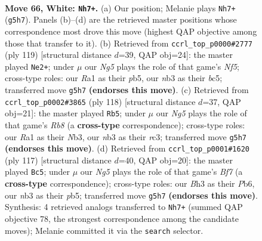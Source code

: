 \documentclass[11pt]{article}
\begin{document}
\clearpage

\begin{figure}[p]\centering
\begin{subfigure}{0.46\textwidth}\centering
\resizebox{\linewidth}{!}{%
\newchessgame
\chessboard[
  setfen={b7/P7/5k2/6N1/1p3P2/1n4PB/4K2P/R7 w - - 0 66},
  showmover=false,
  pgfstyle=straightmove, color=movearrow, markmove={g5-h7}
]}
\caption{}
\end{subfigure}\hfill
\begin{subfigure}{0.46\textwidth}\centering
\resizebox{\linewidth}{!}{%
\newchessgame
\chessboard[
  setfen={8/3k4/5p2/1PB1p3/2P1Pn2/6Kp/8/8 b - - 1 60},
  showmover=false,
  pgfstyle=straightmove, color=movearrow, markmove={f4-e2}
]}
\caption{}
\end{subfigure}
\\[4pt]
\begin{subfigure}{0.46\textwidth}\centering
\resizebox{\linewidth}{!}{%
\newchessgame
\chessboard[
  setfen={1R6/k3p2p/8/P5p1/5nP1/1Nr2P2/8/4K3 w - - 6 60},
  showmover=false,
  pgfstyle=straightmove, color=movearrow, markmove={b8-b5}
]}
\caption{}
\end{subfigure}\hfill
\begin{subfigure}{0.46\textwidth}\centering
\resizebox{\linewidth}{!}{%
\newchessgame
\chessboard[
  setfen={7k/R7/1p4p1/1P3pP1/2B5/5K1P/3r1b2/8 b - - 1 59},
  showmover=false,
  pgfstyle=straightmove, color=movearrow, markmove={f2-c5}
]}
\caption{}
\end{subfigure}
\caption{\textbf{Move 66, White: \texttt{Nh7+}.} (a) Our position; Melanie plays \texttt{Nh7+} (\texttt{g5h7}). Panels (b)--(d) are the retrieved master positions whose correspondence most drove this move (highest QAP objective among those that transfer to it). (b) Retrieved from \texttt{ccrl\_top\_p0000\#2777} (ply 119) [structural distance $d$=39, QAP obj=24]: the master played \texttt{Ne2+}; under $\mu$ our \emph{Ng5} plays the role of that game's \emph{Nf5}; cross-type roles: our \emph{R}a1 as their \emph{p}b5, our \emph{n}b3 as their \emph{b}c5; transferred move \texttt{g5h7} \textbf{(endorses this move)}. (c) Retrieved from \texttt{ccrl\_top\_p0002\#3865} (ply 118) [structural distance $d$=37, QAP obj=21]: the master played \texttt{Rb5}; under $\mu$ our \emph{Ng5} plays the role of that game's \emph{Rb8} (a \textbf{cross-type} correspondence); cross-type roles: our \emph{R}a1 as their \emph{N}b3, our \emph{n}b3 as their \emph{r}c3; transferred move \texttt{g5h7} \textbf{(endorses this move)}. (d) Retrieved from \texttt{ccrl\_top\_p0001\#1620} (ply 117) [structural distance $d$=40, QAP obj=20]: the master played \texttt{Bc5}; under $\mu$ our \emph{Ng5} plays the role of that game's \emph{Bf7} (a \textbf{cross-type} correspondence); cross-type roles: our \emph{B}h3 as their \emph{P}b6, our \emph{n}b3 as their \emph{p}b5; transferred move \texttt{g5h7} \textbf{(endorses this move)}. Synthesis: 4 retrieved analogs transferred to \texttt{Nh7+} (summed QAP objective 78, the strongest correspondence among the candidate moves); Melanie committed it via the \texttt{search} selector.}
\label{fig:thought-m130}
\end{figure}
\end{document}
